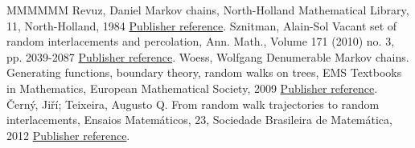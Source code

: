 \documentclass[11pt]{article}
\theoremstyle{definition}
\numberwithin{equation}{section}
\numberwithin{figure}{section}
\numberwithin{table}{section}
\newcommand{\1}[1]{{\mathbf 1}{\{#1\}}}
\newcommand{\8}{{\infty}}
\begin{document}
\begin{thebibliography}{MMMMMM}
 Revuz, Daniel Markov chains, North-Holland Mathematical Library, 11, North-Holland, 1984 \href{https://ahl.centre-mersenne.org/item/AHL_2019__2__349_0/#R84}{Publisher reference}.
 Sznitman, Alain-Sol Vacant set of random interlacements and percolation, Ann. Math., Volume 171 (2010) no. 3, pp. 2039-2087 \href{https://ahl.centre-mersenne.org/item/AHL_2019__2__349_0/#Szn10}{Publisher reference}.
 Woess, Wolfgang Denumerable Markov chains. Generating functions, boundary theory, random walks on trees, EMS Textbooks in Mathematics, European Mathematical Society, 2009 \href{https://ahl.centre-mersenne.org/item/AHL_2019__2__349_0/#Woess09}{Publisher reference}.
 Černý, Jiří; Teixeira, Augusto Q. From random walk trajectories to random interlacements, Ensaios Matemáticos, 23, Sociedade Brasileira de Matemática, 2012 \href{https://ahl.centre-mersenne.org/item/AHL_2019__2__349_0/#CT12}{Publisher reference}.
\end{thebibliography}
\end{document}
